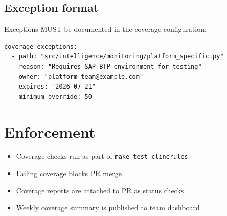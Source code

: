 \subsection{Exception format}

Exceptions MUST be documented in the coverage configuration:

\begin{verbatim}
coverage_exceptions:
  - path: "src/intelligence/monitoring/platform_specific.py"
    reason: "Requires SAP BTP environment for testing"
    owner: "platform-team@example.com"
    expires: "2026-07-21"
    minimum_override: 50
\end{verbatim}

\section{Enforcement}

\begin{itemize}
  \item Coverage checks run as part of \texttt{make test-clinerules}
  \item Failing coverage blocks PR merge
  \item Coverage reports are attached to PR as status checks
  \item Weekly coverage summary is published to team dashboard
\end{itemize}